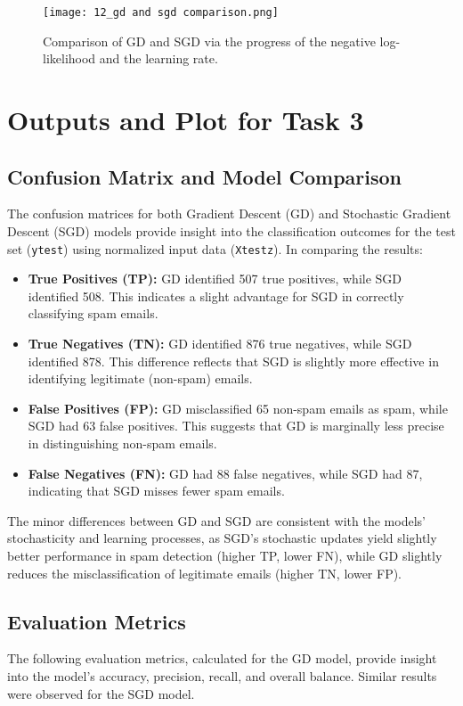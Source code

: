 \documentclass[a4paper,oneside,bibliography=totoc]{scrartcl}
\begin{document}
\begin{figure}[H]
    \centering
    \texttt{[image: 12\_gd and sgd comparison.png]}
    \caption{Comparison of GD and SGD via the progress of the negative log-likelihood and the learning rate.}
    \label{fig:12}
\end{figure}

\section{Outputs and Plot for Task 3}
\label{section3}


\subsection{Confusion Matrix and Model Comparison}
The confusion matrices for both Gradient Descent (GD) and Stochastic Gradient Descent (SGD) models provide insight into the classification outcomes for the test set (\texttt{ytest}) using normalized input data (\texttt{Xtestz}). In comparing the results:

\begin{itemize}
    \item \textbf{True Positives (TP):} GD identified 507 true positives, while SGD identified 508. This indicates a slight advantage for SGD in correctly classifying spam emails.
    \item \textbf{True Negatives (TN):} GD identified 876 true negatives, while SGD identified 878. This difference reflects that SGD is slightly more effective in identifying legitimate (non-spam) emails.
    \item \textbf{False Positives (FP):} GD misclassified 65 non-spam emails as spam, while SGD had 63 false positives. This suggests that GD is marginally less precise in distinguishing non-spam emails.
    \item \textbf{False Negatives (FN):} GD had 88 false negatives, while SGD had 87, indicating that SGD misses fewer spam emails.
\end{itemize}

The minor differences between GD and SGD are consistent with the models’ stochasticity and learning processes, as SGD’s stochastic updates yield slightly better performance in spam detection (higher TP, lower FN), while GD slightly reduces the misclassification of legitimate emails (higher TN, lower FP).

\subsection{Evaluation Metrics}
The following evaluation metrics, calculated for the GD model, provide insight into the model’s accuracy, precision, recall, and overall balance. Similar results were observed for the SGD model.
\end{document}
